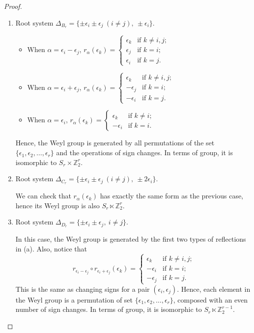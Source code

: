 \documentclass[10pt,twoside]{article}
\newcommand{\Zz}{\mathbb Z}
\theoremstyle{definition}
\theoremstyle{remark}
\begin{document}
\begin{proof}\ 
\renewcommand{\labelenumi}{(\alph{enumi})}
\begin{enumerate}
\item Root system $\Delta_{B_r}=\{\pm\epsilon_i\pm\epsilon_j \ ( i\neq j), \ \pm\epsilon_i \}$.
\begin{itemize}
\item
When $\alpha=\epsilon_i-\epsilon_j$, $r_\alpha(\epsilon_k)=\begin{cases}
\epsilon_k & \text{if $k\neq i,j$;}\\
\epsilon_j & \text{if $k=i$;}\\
\epsilon_i & \text{if $k=j$.}
\end{cases}$

\item
When $\alpha=\epsilon_i+\epsilon_j$, $r_\alpha(\epsilon_k)=\begin{cases}
\epsilon_k & \text{if $k\neq i,j$;}\\
-\epsilon_j & \text{if $k=i$;}\\
-\epsilon_i & \text{if $k=j$.}
\end{cases}$

\item
When $\alpha=\epsilon_i$,  $r_\alpha(\epsilon_k)=\begin{cases}
\epsilon_k & \text{if $k\neq i$;}\\
-\epsilon_i & \text{if $k=i$.}
\end{cases}$

\end{itemize}

Hence, the Weyl group is generated by all permutations of the set $\{ \epsilon_1, \epsilon_2,\dotsc, \epsilon_r \}$ and the operations of sign changes.  In terms of group, it is isomorphic to $S_r \times \Zz_2^r$.

\item Root system $\Delta_{C_r}=\{\pm\epsilon_i\pm\epsilon_j \ ( i\neq j), \ \pm 2\epsilon_i \}$.

We can check that $r_\alpha(\epsilon_k)$ has exactly the same form as the previous case, hence its Weyl group is also $S_r \ltimes \Zz_2^r$.

\item Root system $\Delta_{D_r}=\{\pm\epsilon_i\pm\epsilon_j, \ i\neq j \}$.

In this case, the Weyl group is generated by the first two types of reflections in (a).  Also, notice that $$r_{\epsilon_i-\epsilon_j}\circ r_{\epsilon_i+\epsilon_j}(\epsilon_k)=\begin{cases}
\epsilon_k & \text{if $k\neq i,j$;}\\
-\epsilon_i & \text{if $k=i$;}\\
-\epsilon_j & \text{if $k=j$.}
\end{cases}$$
This is the same as changing signs for a pair $(\epsilon_i, \epsilon_j)$.
Hence, each element in the Weyl group is a permutation of set $\{ \epsilon_1, \epsilon_2,\dotsc, \epsilon_r \}$, composed with an even number of sign changes.  In terms of group, it is isomorphic to $S_r \ltimes \Zz_2^{r-1}$.
\end{enumerate}
\end{proof}
\end{document}
